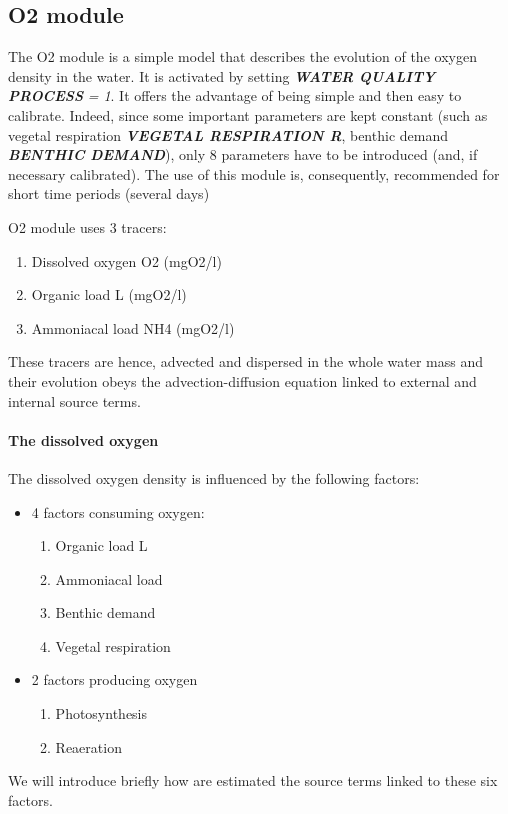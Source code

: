\subsection{ O2 module}
\label{subs:O2:mod}


 The O2 module is a simple model that describes the evolution of the oxygen density in the water. It is activated by setting \textbf{\textit{WATER QUALITY PROCESS}}\textit{ = 1}. It offers the advantage of being simple and then easy to calibrate. Indeed, since some important parameters are kept constant (such as vegetal respiration \textbf{\textit{VEGETAL RESPIRATION R}}, benthic demand \textbf{\textit{BENTHIC DEMAND}}), only 8 parameters have to be introduced (and, if necessary calibrated). The use of this module is, consequently, recommended for short time periods (several days)

 O2 module uses 3 tracers:

\begin{enumerate}
\item  Dissolved oxygen O2 (mgO2/l)

\item  Organic load L (mgO2/l)

\item  Ammoniacal load NH4 (mgO2/l)
\end{enumerate}

 These tracers are hence, advected and dispersed in the whole water mass and their evolution obeys the advection-diffusion equation linked to external and internal source terms.


\paragraph{ The dissolved oxygen}

 The dissolved oxygen density is influenced by the following factors:

\begin{itemize}
\item  4 factors consuming oxygen:

\begin{enumerate}
\item  Organic load L
\item  Ammoniacal load
\item  Benthic demand
\item  Vegetal respiration
\end{enumerate}

\item  2 factors producing oxygen
\begin{enumerate}
\item  Photosynthesis

\item  Reaeration
\end{enumerate}
\end{itemize}
 We will introduce briefly how are estimated the source terms linked to these six factors.




